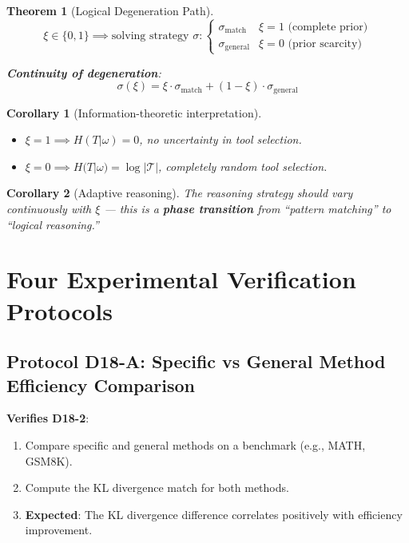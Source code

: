 \documentclass[12pt, a4paper]{article}
\newtheorem{theorem}{Theorem}[section]
\newtheorem{corollary}{Corollary}[section]
\begin{document}
\begin{theorem}[Logical Degeneration Path]\label{thm:d18-5}
$$\xi \in \{0, 1\} \implies \text{solving strategy } \sigma: \begin{cases} \sigma_{\text{match}} & \xi = 1 \text{ (complete prior)}\\ \sigma_{\text{general}} & \xi = 0 \text{ (prior scarcity)}\end{cases}$$

\textbf{Continuity of degeneration}:
$$\sigma(\xi) = \xi \cdot \sigma_{\text{match}} + (1 - \xi) \cdot \sigma_{\text{general}}$$
\end{theorem}

\begin{corollary}[Information-theoretic interpretation]
\begin{itemize}
\item $\xi = 1 \implies H(T|\omega) = 0$, no uncertainty in tool selection.
\item $\xi = 0 \implies H(T|\omega) = \log |\mathcal{T}|$, completely random tool selection.
\end{itemize}
\end{corollary}

\begin{corollary}[Adaptive reasoning]
The reasoning strategy should vary continuously with $\xi$ --- this is a \textbf{phase transition} from ``pattern matching'' to ``logical reasoning.''
\end{corollary}

\section{Four Experimental Verification Protocols}

\subsection{Protocol D18-A: Specific vs General Method Efficiency Comparison}

\textbf{Verifies D18-2}:
\begin{enumerate}
\item Compare specific and general methods on a benchmark (e.g., MATH, GSM8K).
\item Compute the KL divergence match for both methods.
\item \textbf{Expected}: The KL divergence difference correlates positively with efficiency improvement.
\end{enumerate}
\end{document}
